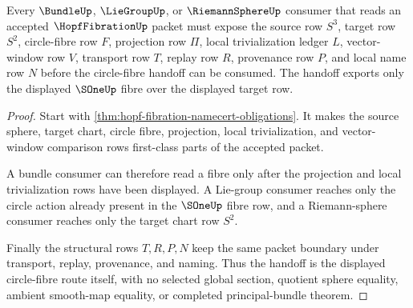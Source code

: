 \begin{theorem}
\label{thm:hopf-fibration-circle-fibre-handoff}
Every $\BundleUp$, $\LieGroupUp$, or $\RiemannSphereUp$ consumer that reads an accepted $\HopfFibrationUp$ packet must expose the source row $S^{3}$, target row $S^{2}$, circle-fibre row $F$, projection row $\Pi$, local trivialization ledger $L$, vector-window row $V$, transport row $T$, replay row $R$, provenance row $P$, and local name row $N$ before the circle-fibre handoff can be consumed. The handoff exports only the displayed $\SOneUp$ fibre over the displayed target row.
\end{theorem}
\begin{proof}
Start with \autoref{thm:hopf-fibration-namecert-obligations}. It makes the source sphere, target chart, circle fibre, projection, local trivialization, and vector-window comparison rows first-class parts of the accepted packet.

A bundle consumer can therefore read a fibre only after the projection and local trivialization rows have been displayed. A Lie-group consumer reaches only the circle action already present in the $\SOneUp$ fibre row, and a Riemann-sphere consumer reaches only the target chart row $S^{2}$.

Finally the structural rows $T,R,P,N$ keep the same packet boundary under transport, replay, provenance, and naming. Thus the handoff is the displayed circle-fibre route itself, with no selected global section, quotient sphere equality, ambient smooth-map equality, or completed principal-bundle theorem.
\end{proof}


\begin{closurestatus}{\HopfFibrationUp}
  \theoryclosure{\seedClosure}
  \formalstatus{\formalTargetV}
\end{closurestatus}
